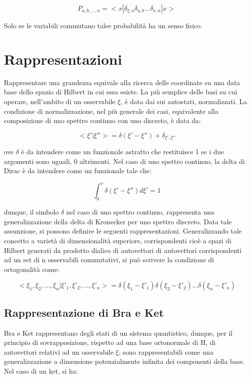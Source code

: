 \documentclass{article}
\begin{document}
\begin{equation}
    P_{a,b,...,n}=<x|\delta_{\xi,a}\delta_{\eta,b}...\delta_{\nu,n}|x>
\end{equation}

Solo se le variabili commutano talee probabilità ha un senso fisico.


\section{Rappresentazioni}
Rappresentare una grandezza equivale alla ricerca delle coordinate su una data base dello spazio di Hilbert in cui essa esiste.
La più semplice delle basi su cui operare, nell'ambito di un osservabile $\xi$, è data dai sui autostati, normalizzati.
La condizione di normalizzazione, nel più generale dei casi, equivalente alla composizione di uno spettro continuo con uno discreto, è data da:

\begin{equation}
    <\xi'|\xi''> = \delta(\xi'-\xi'') + \delta_{\xi',\xi''}
\end{equation}

ove $\delta$ è da intendere come un funzionale astratto che restituisce 1 se i due argomenti sono uguali, 0 altrimenti.
Nel caso di uno spettro continuo, la delta di Dirac è da intendere come un funzionale tale che:

\begin{equation}
    \int_{0}^{v} \delta(\xi'-\xi'')d\xi' = 1
\end{equation}

dunque, il simbolo $\delta$ nel caso di uno spettro continuo, rappresenta una generalizzazione della delta di Kronecker per uno spettro discreto.
Data tale assunzione, si possono definire le seguenti rappresentazioni.
Generalizzando tale concetto a varietà di dimensionalità superiore, corrispondenti cioè a spazi di Hilbert generati da prodotto dialico
di autovettori di autovettori corrispondenti ad un set di n osservabili commutativi, si può scrivere la condizione di ortogonalità come:

\begin{equation}
    <\xi_1,\xi_2,...,\xi_n|\xi'_1,\xi'_2,...,\xi'_n> = \delta(\xi_1-\xi'_1)\delta(\xi_2-\xi'_2)...\delta(\xi_n-\xi'_n)
\end{equation}

\subsection{Rappresentazione di Bra e Ket}
Bra e Ket rappresentano degli stati di un sistema quantistico, dunque, per il principio di sovrapposizione,
rispetto ad una base ortonormale di H, di autovettori relativi ad un osservabile $\xi$, sono rappresentabili come
una generalizzazione a dimensione potenzialmente infinita dei componenti della base.
Nel caso di un ket, si ha:
\end{document}
